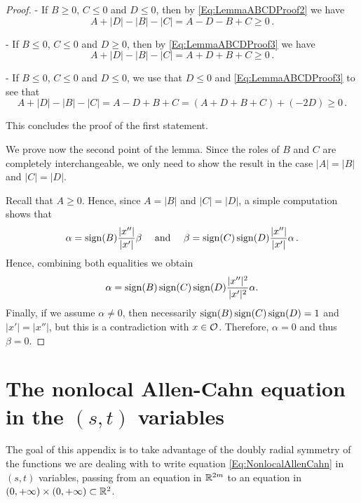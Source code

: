 \begin{proof}
- If $B \geq 0$, $C \leq 0$ and $D \leq 0$, then by \eqref{Eq:LemmaABCDProof2} we have
$$
A + |D| - |B| - |C| = A - D - B + C \geq 0\,.
$$

- If $B \leq 0$, $C \leq 0$ and $D \geq 0$, then by \eqref{Eq:LemmaABCDProof3} we have
$$
A + |D| - |B| - |C| = A + D + B + C \geq 0\,.
$$

- If $B \leq 0$, $C \leq 0$ and $D \leq 0$, we use that $D\leq 0$ and \eqref{Eq:LemmaABCDProof3} to
see that
$$
A + |D| - |B| - |C| = A - D + B + C =  (A + D + B + C) + (-2D) \geq 0\,.
$$

This concludes the proof of the first statement.

We prove now the second point of the lemma. Since the roles of $B$ and $C$ are completely
interchangeable, we only need to show the result in the case $|A| = |B|$ and $|C| = |D|$.

Recall that $A \geq 0$. Hence, since $A = |B|$ and $|C| = |D|$, a simple computation shows that
$$
\alpha = \operatorname{sign} (B) \dfrac{|x''|}{|x'|}\beta \quad \textrm{ and } \quad
\beta = \operatorname{sign} (C) \operatorname{sign}(D) \dfrac{|x''|}{|x'|} \alpha \,.
$$
Hence, combining both equalities we obtain
$$
\alpha = \operatorname{sign} (B) \operatorname{sign} (C) \operatorname{sign}(D) \dfrac{|x''|^2}{|x'|^2} \alpha.
$$
Finally, if we assume $\alpha \neq 0$, then necessarily $\operatorname{sign} (B) \operatorname{sign} (C) \operatorname{sign}(D)=1$ and $|x'|
= |x''|$, but this is a contradiction with $x\in \mathcal{O}$. Therefore, $\alpha = 0$ and thus $\beta =
0$.
\end{proof}








\section{The nonlocal Allen-Cahn equation in the $(s,t)$ variables}
\label{Sec:stcomputations}

The goal of this appendix is to take advantage of the doubly radial symmetry of the functions we
are dealing with to write equation \eqref{Eq:NonlocalAllenCahn} in $(s,t)$ variables, passing from
an equation in $\mathbb{R}^{2m}$ to an equation in $(0,+\infty)\times (0,+\infty)\subset \mathbb{R}^2$.

